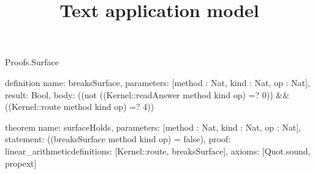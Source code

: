 \begin{lexlean}{Proofs.Surface}
\title{Text application model}
\begin{semanticmodule}
definition{
  name: breaksSurface,
  parameters: [method : Nat, kind : Nat, op : Nat],
  result: Bool,
  body: ((not ((Kernel::readAnswer method kind op) =? 0)) && ((Kernel::route method kind op) =? 4))
}

theorem{
  name: surfaceHolds,
  parameters: [method : Nat, kind : Nat, op : Nat],
  statement: ((breaksSurface method kind op) = false),
  proof: linear_arithmetic{definitions: [Kernel::route, breaksSurface]},
  axioms: [Quot.sound, propext]
}
\end{semanticmodule}
\end{lexlean}
